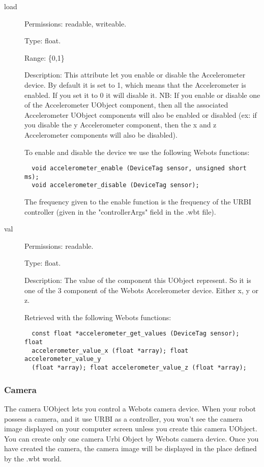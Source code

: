 \noindent
\begin{description}
\item[{load}] Permissions: readable, writeable.


  Type: float.


  Range: \{0,1\}


  Description: This attribute let you enable or disable the
  Accelerometer device.  By default it is set to 1, which means that
  the Accelerometer is enabled. If you set it to 0 it will disable
  it. NB: If you enable or disable one of the Accelerometer UObject
  component, then all the associated Accelerometer UObject components
  will also be enabled or disabled (ex: if you disable the y
  Accelerometer component, then the x and z Accelerometer components
  will also be disabled).


  To enable and disable the device we use the following Webots
  functions:


\begin{lstlisting}
  void accelerometer_enable (DeviceTag sensor, unsigned short ms);
  void accelerometer_disable (DeviceTag sensor);
\end{lstlisting}

The frequency given to the enable function is the frequency of the
URBI controller (given in the "controllerArgs" field in the .wbt
file).

\item[{ val }] Permissions: readable.


  Type: float.


  Description: The value of the component this UObject represent. So
  it is one of the 3 component of the Webots Accelerometer
  device. Either x, y or z.


  Retrieved with the following Webots functions:


\begin{lstlisting}
  const float *accelerometer_get_values (DeviceTag sensor); float
  accelerometer_value_x (float *array); float accelerometer_value_y
  (float *array); float accelerometer_value_z (float *array);
\end{lstlisting}
\end{description}

\subsubsection{Camera}
\label{webots.uobjects.robotdevices.camera}%

   The camera UObject lets you control a Webots camera device. When your robot
  possess a camera, and it use
  URBI as a controller, you won't see the camera image displayed on your computer
  screen unless you create this camera UObject. You can create only one
  camera Urbi Object by Webots camera device. Once you have created the camera,
  the camera image will be displayed in the place defined by the .wbt world.


